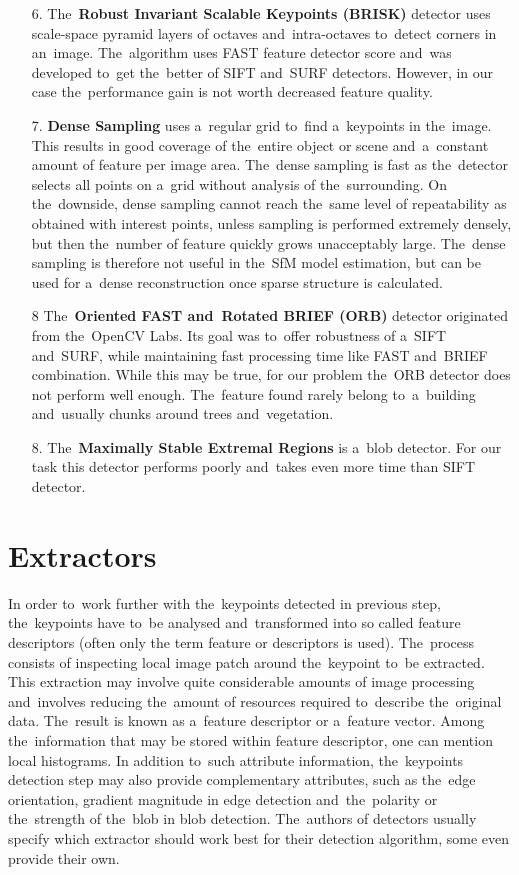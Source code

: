 \begin{itemize}
	\item[6.] The~\textbf{Robust Invariant Scalable Keypoints (BRISK)} detector uses scale-space pyramid layers of octaves and~intra-octaves to~detect corners in an~image. The~algorithm uses FAST feature detector score and~was developed to~get the~better of SIFT and~SURF detectors. However, in our case the~performance gain is not worth decreased feature quality. \cite{article:brisk}
	
	\item[7.] \textbf{Dense Sampling} uses a~regular grid to~find a~keypoints in the~image. This results in good coverage of the~entire object or scene and~a~constant amount of feature per image area. The~dense sampling is fast as the~detector selects all points on a~grid without analysis of the~surrounding. On the~downside, dense sampling cannot reach the~same level of repeatability as obtained with interest points, unless sampling is performed extremely densely, but then the~number of feature quickly grows unacceptably large. The~dense sampling is therefore not useful in the~SfM model estimation, but can be used for a~dense reconstruction once sparse structure is calculated. \cite{article:dense}
	
	\item[8] The~\textbf{Oriented FAST and~Rotated BRIEF (ORB)} detector originated from the~OpenCV Labs. Its goal was to~offer robustness of a~SIFT and~SURF, while maintaining fast processing time like FAST and~BRIEF combination. While this may be true, for our problem the~ORB detector does not perform well enough. The~feature found rarely belong to~a~building and~usually chunks around trees and~vegetation. \cite{www:orb}\cite{article:orb}
	
	\item[8.] The~\textbf{Maximally Stable Extremal Regions} is a~blob detector. For our task this detector performs poorly and~takes even more time than SIFT detector.
\end{itemize}

\section{Extractors}
\label{sec:extractors}
In order to~work further with the~keypoints detected in previous step, the~keypoints have to~be analysed and~transformed into so called feature descriptors (often only the term feature or descriptors is used). The~process consists of inspecting local image patch around the~keypoint to~be extracted. This extraction may involve quite considerable amounts of image processing and~involves reducing the~amount of resources required to~describe the~original data. The~result is known as a~feature descriptor or a~feature vector. Among the~information that may be stored within feature descriptor, one can mention local histograms. In addition to~such attribute information, the~keypoints detection step may also provide complementary attributes, such as the~edge orientation, gradient magnitude in edge detection and~the~polarity or the~strength of the~blob in blob detection. The~authors of detectors usually specify which extractor should work best for their detection algorithm, some even provide their own.

